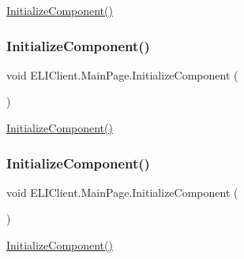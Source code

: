 \hyperlink{class_e_l_i_client_1_1_main_page_a337e38b87a30d8d30bcc2a9164f0ac41}{Initialize\+Component()} 

\mbox{\label{class_e_l_i_client_1_1_main_page_a337e38b87a30d8d30bcc2a9164f0ac41}} 
\subsubsection{\texorpdfstring{Initialize\+Component()}{InitializeComponent()}\hspace{0.1cm}{\footnotesize\ttfamily [2/3]}}
{\footnotesize\ttfamily void E\+L\+I\+Client.\+Main\+Page.\+Initialize\+Component (\begin{DoxyParamCaption}{ }\end{DoxyParamCaption})\hspace{0.3cm}{\ttfamily [inline]}}



\hyperlink{class_e_l_i_client_1_1_main_page_a337e38b87a30d8d30bcc2a9164f0ac41}{Initialize\+Component()} 

\mbox{\label{class_e_l_i_client_1_1_main_page_a337e38b87a30d8d30bcc2a9164f0ac41}} 
\subsubsection{\texorpdfstring{Initialize\+Component()}{InitializeComponent()}\hspace{0.1cm}{\footnotesize\ttfamily [3/3]}}
{\footnotesize\ttfamily void E\+L\+I\+Client.\+Main\+Page.\+Initialize\+Component (\begin{DoxyParamCaption}{ }\end{DoxyParamCaption})\hspace{0.3cm}{\ttfamily [inline]}}



\hyperlink{class_e_l_i_client_1_1_main_page_a337e38b87a30d8d30bcc2a9164f0ac41}{Initialize\+Component()} 

